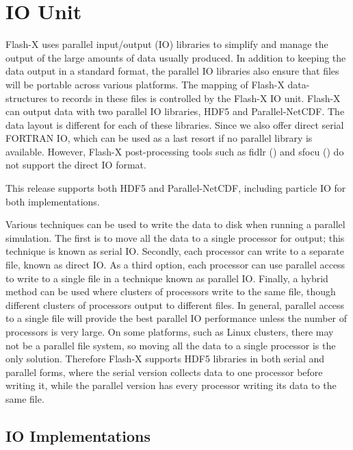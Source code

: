 \chapter{IO Unit} \label{Chp:IO}


Flash-X uses parallel input/output (IO) libraries to simplify and manage the output of
the large amounts of data usually produced. In addition to keeping the
data output in a standard format, the parallel IO libraries also
ensure that files will be portable across various platforms.  The
mapping of Flash-X data-structures to records in these files is
controlled by the Flash-X IO unit.  Flash-X can output data with two
parallel IO libraries, HDF5%
and Parallel-NetCDF.
The data layout is different for each of these libraries.  
Since \flashx we also offer direct serial FORTRAN IO, which
can be used as a last resort if no parallel library is available.
However, Flash-X post-processing tools such as fidlr  () and sfocu () do not support the direct IO
format.

\begin{flashtip}[Note:]
This release supports both
HDF5 and Parallel-NetCDF, including particle IO for both
implementations.  
\end{flashtip}


Various techniques can be used to write the data to disk when
running a parallel simulation.  The first is to move all the data to
a single processor for output; this technique is known as serial IO.
Secondly, each processor can write
to a separate file, known as direct IO.
As a third option, each processor can use parallel access to
write to a single file in a technique known as parallel IO. Finally,
a hybrid method can be used where clusters of processors write to 
the same file, though different clusters of processors output to 
different files.
In general, parallel access to a single file
will provide the best parallel IO performance unless the number of
processors is very large. On some platforms, such as Linux clusters,
there may not be a parallel file system, so moving all the data to a
single processor is the only solution. Therefore Flash-X supports HDF5
libraries in both serial and parallel forms, where the serial version
collects data to one processor before writing it, while the parallel
version has every processor writing its data to the same file.


\section{IO Implementations}\label{Sec:Flash-X output formats}

